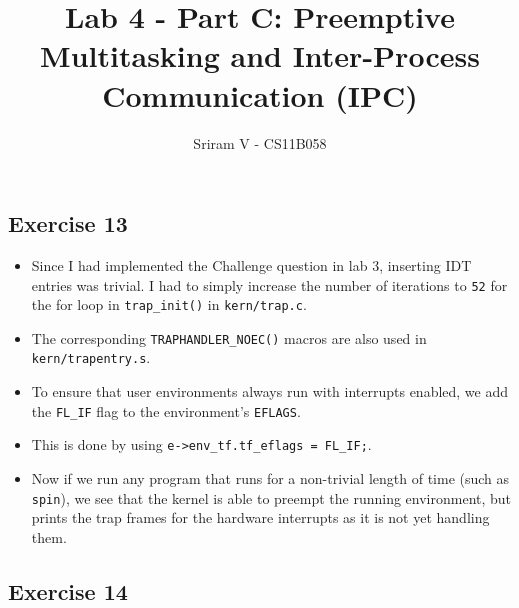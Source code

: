 \documentclass[]{article}
\title{Lab 4 - Part C: Preemptive Multitasking and Inter-Process Communication
       (IPC)}
\author{Sriram V - CS11B058}
\date{}
\begin{document}
\maketitle

\subsection{Exercise 13}

\begin{itemize}
\itemsep1pt\parskip0pt
\item
  Since I had implemented the Challenge question in lab 3, inserting IDT
  entries was trivial. I had to simply increase the number of iterations
  to \texttt{52} for the for loop in \texttt{trap\_init()} in
  \texttt{kern/trap.c}.
\item
  The corresponding \texttt{TRAPHANDLER\_NOEC()} macros are also used in
  \texttt{kern/trapentry.s}.
\item
  To ensure that user environments always run with interrupts enabled,
  we add the \texttt{FL\_IF} flag to the environment's \texttt{EFLAGS}.
\item
  This is done by using
  \texttt{e-\textgreater{}env\_tf.tf\_eflags \textbar{}= FL\_IF;}.
\item
  Now if we run any program that runs for a non-trivial length of time
  (such as \texttt{spin}), we see that the kernel is able to preempt the
  running environment, but prints the trap frames for the hardware
  interrupts as it is not yet handling them.
\end{itemize}

\subsection{Exercise 14}
\end{document}
